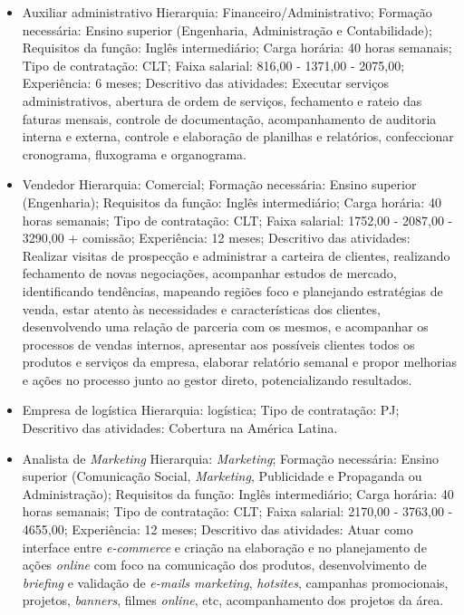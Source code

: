 \documentclass[
	12pt,				%
	openright,			%
	oneside,			%
	a4paper,			%
	english,			%
	french,				%
	spanish,			%
	brazil				%
	]{abntex2}
\begin{document}
	\begin{itemize}
		\item Auxiliar administrativo
		\subitem Hierarquia: Financeiro/Administrativo;
		\subitem Formação necessária: Ensino superior (Engenharia, Administração e Contabilidade);
		\subitem Requisitos da função: Inglês intermediário;
		\subitem Carga horária: 40 horas semanais;
		\subitem Tipo de contratação: CLT;
		\subitem Faixa salarial: 816,00 - 1371,00 - 2075,00;
		\subitem Experiência: 6 meses;
		\subitem Descritivo das atividades: Executar serviços administrativos, abertura de ordem de serviços, fechamento e rateio das faturas mensais, controle de documentação, acompanhamento de auditoria interna e externa, controle e elaboração de planilhas e relatórios, confeccionar cronograma, fluxograma e organograma.
		
		\item Vendedor
		\subitem Hierarquia: Comercial;
		\subitem Formação necessária: Ensino superior (Engenharia);
		\subitem Requisitos da função: Inglês intermediário;
		\subitem Carga horária: 40 horas semanais;
		\subitem Tipo de contratação: CLT;
		\subitem Faixa salarial: 1752,00 - 2087,00 - 3290,00 + comissão;
		\subitem Experiência: 12 meses;
		\subitem Descritivo das atividades: Realizar visitas de prospecção e administrar a carteira de clientes, realizando fechamento de novas negociações, acompanhar estudos de mercado, identificando tendências, mapeando regiões foco e planejando estratégias de venda, estar atento às necessidades e características dos clientes, desenvolvendo uma relação de parceria com os mesmos, e acompanhar os processos de vendas internos, apresentar aos possíveis clientes todos os produtos e serviços da empresa, elaborar relatório semanal e propor melhorias e ações no processo junto ao gestor direto, potencializando resultados.
		
		\item Empresa de logística
		\subitem Hierarquia: logística;
		\subitem Tipo de contratação: PJ;
		\subitem Descritivo das atividades: Cobertura na América Latina.
		
		\item Analista de \textit{Marketing}
		\subitem Hierarquia: \textit{Marketing};
		\subitem Formação necessária: Ensino superior (Comunicação Social, \textit{Marketing}, Publicidade e Propaganda ou Administração);
		\subitem Requisitos da função: Inglês intermediário;
		\subitem Carga horária: 40 horas semanais;
		\subitem Tipo de contratação: CLT;
		\subitem Faixa salarial: 2170,00 - 3763,00 - 4655,00;
		\subitem Experiência: 12 meses;
		\subitem Descritivo das atividades: Atuar como interface entre \textit{e-commerce} e criação na elaboração e no planejamento de ações \textit{online} com foco na comunicação dos produtos, desenvolvimento de \textit{briefing} e validação de \textit{e-mails marketing}, \textit{hotsites}, campanhas promocionais, projetos, \textit{banners}, filmes \textit{online}, etc, acompanhamento dos projetos da área.
		

\end{itemize}
\end{document}
